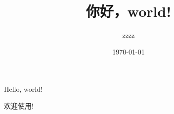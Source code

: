 \documentclass[UTF8, fontset=mac]{ctexart}
\title{你好，world!}
\author{zzzz}
\date{\today}
\begin{document}
	
	Hello, world!
	
	欢迎使用!
	
	
	
%	
%	
\end{document}

